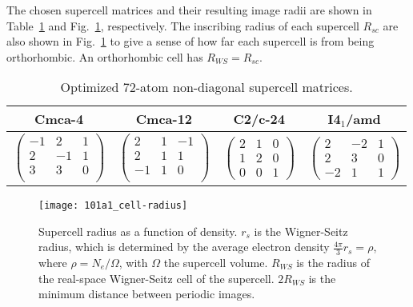 The chosen supercell matrices and their resulting image radii are shown in Table~\ref{tab:hsolid-tmat72} and Fig.~\ref{fig:cell-radius}, respectively.
The inscribing radius of each supercell $R_{sc}$ are also shown in Fig.~\ref{fig:cell-radius} to give a sense of how far each supercell is from being orthorhombic. An orthorhombic cell has $R_{WS} = R_{sc}$.
\begin{table}[h]
\centering
\caption{Optimized 72-atom non-diagonal supercell matrices.}
\label{tab:hsolid-tmat72}
\begin{tabular}{cccc}
\hline\hline
Cmca-4 & Cmca-12 & C2/c-24 & I4$_1$/amd \\
\hline
$\left(\begin{array}{rrr}
-1 &  2 &  1 \\
 2 & -1 &  1 \\
 3 &  3 &  0 \\
\end{array}\right)$ & $\left(\begin{array}{rrr}
 2 &  1 &  -1 \\
 2 &  1 &   1 \\
 -1 &  1 &  0 \\
\end{array}\right)$ & $\left(\begin{array}{rrr}
 2 &  1 &  0 \\
 1 &  2 &  0 \\
 0 &  0 &  1
\end{array}\right)$ & $\left(\begin{array}{rrr}
 2 & -2 &  1 \\
 2 &  3 &  0 \\
-2 &  1 &  1
\end{array}\right)$ \\
\hline\hline
\end{tabular}
\end{table}

\begin{figure}[h]
\centering
\texttt{[image: 101a1\_cell-radius]}
\caption{Supercell radius as a function of density. $r_s$ is the Wigner-Seitz radius, which is determined by the average electron density $\frac{4\pi}{3}r_s=\rho$, where $\rho=N_e/\Omega$, with $\Omega$ the supercell volume. $R_{WS}$ is the radius of the real-space Wigner-Seitz cell of the supercell. $2R_{WS}$ is the minimum distance between periodic images. \label{fig:cell-radius}}
\end{figure}

%
%

